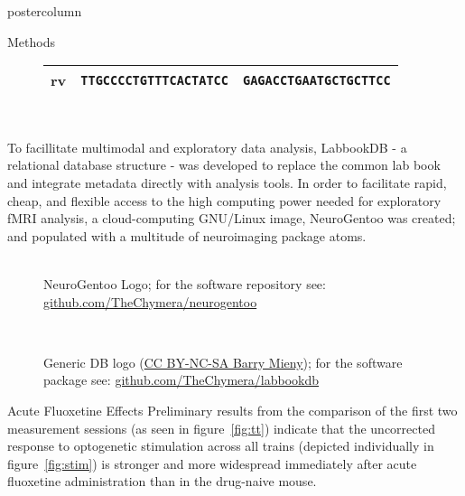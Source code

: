 \documentclass{beamer}
\begin{document}
\begin{frame}
\begin{columns}
\begin{column}{.57\textwidth}
\begin{beamercolorbox}[center]{postercolumn}
\begin{minipage}{.98\textwidth}
{\begin{myblock}{Methods}
\begin{figure}
\begin{minipage}{.45\textwidth}
\begin{tabular}{@{} p{.1\linewidth} r r @{}}
									rv &   \texttt{TTGCCCCTGTTTCACTATCC}         & \texttt{GAGACCTGAATGCTGCTTCC}    \\
									\bottomrule
								\end{tabular}
							\end{minipage}
							\begin{minipage}{.45\textwidth}
								\centering%
\\%
							\end{minipage}
						\end{figure}
						\vspace{1em}
						To facillitate multimodal and exploratory data analysis, LabbookDB - a relational database structure - was developed to replace the common lab book and integrate metadata directly with analysis tools.
						In order to facilitate rapid, cheap, and flexible access to the high computing power needed for exploratory fMRI analysis, a cloud-computing GNU/Linux image, NeuroGentoo was created;
						and populated with a multitude of neuroimaging package atoms.
						\vspace{0.5em}
						\begin{figure}
							\begin{minipage}{0.43\textwidth}								
\centering%
\\%
								\caption{NeuroGentoo Logo; for the software repository see: \href{https://github.com/TheChymera/neurogentoo}{github.com/TheChymera/neurogentoo}}
							\end{minipage}
							\hspace{1em}
							\begin{minipage}{0.45\textwidth}
								\centering%
\\%
								\caption{Generic DB logo (\href{https://creativecommons.org/licenses/by-nc-sa/3.0/}{CC BY-NC-SA Barry Mieny}); for the software package see: \href{https://github.com/TheChymera/labbookdb}{github.com/TheChymera/labbookdb}}
							\end{minipage}
						\end{figure}
					\end{myblock}\vfill
					\begin{myblock}{Acute Fluoxetine Effects}
						Preliminary results from the comparison of the first two measurement sessions (as seen in figure~\ref{fig:tt}) indicate that the uncorrected response to optogenetic stimulation across all trains (depicted individually in figure~\ref{fig:stim}) is stronger and more widespread immediately after acute fluoxetine administration than in the drug-naive mouse.

\end{myblock}}
\end{minipage}
\end{beamercolorbox}
\end{column}
\end{columns}
\end{frame}
\end{document}
